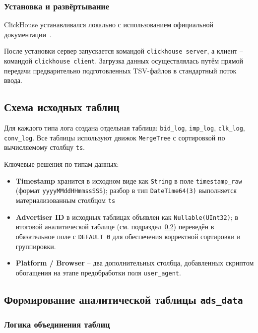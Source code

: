 \subsubsection*{Установка и развёртывание}

ClickHouse устанавливался локально с использованием официальной документации~\cite{clickhouse-install}. 

После установки сервер запускается командой \texttt{clickhouse server}, а клиент -- командой \texttt{clickhouse client}. Загрузка данных осуществлялась путём прямой передачи предварительно подготовленных TSV-файлов в стандартный поток ввода.

\subsection{Схема исходных таблиц}
\label{subsec:table_schema}

Для каждого типа лога создана отдельная таблица: \texttt{bid\_log}, \texttt{imp\_log}, \texttt{clk\_log}, \texttt{conv\_log}. Все таблицы используют движок \texttt{MergeTree} с сортировкой по вычисляемому столбцу \texttt{ts}.

Ключевые решения по типам данных:

\begin{itemize}
    \item \textbf{Timestamp} хранится в исходном виде как \texttt{String} в поле \texttt{timestamp\_raw} (формат \texttt{yyyyMMddHHmmssSSS}); разбор в тип \texttt{DateTime64(3)} выполняется материализованным столбцом \texttt{ts}
    \item \textbf{Advertiser ID} в исходных таблицах объявлен как \texttt{Nullable(UInt32)}; в итоговой аналитической таблице (см. подраздел~\ref{subsec:ads_data}) переведён в обязательное поле с \texttt{DEFAULT 0} для обеспечения корректной сортировки и группировки.
    \item \textbf{Platform / Browser} -- два дополнительных столбца, добавленных скриптом обогащения на этапе предобработки поля \texttt{user\_agent}.
\end{itemize}

\subsection{Формирование аналитической таблицы \texttt{ads\_data}}
\label{subsec:ads_data}

\subsubsection*{Логика объединения таблиц}


